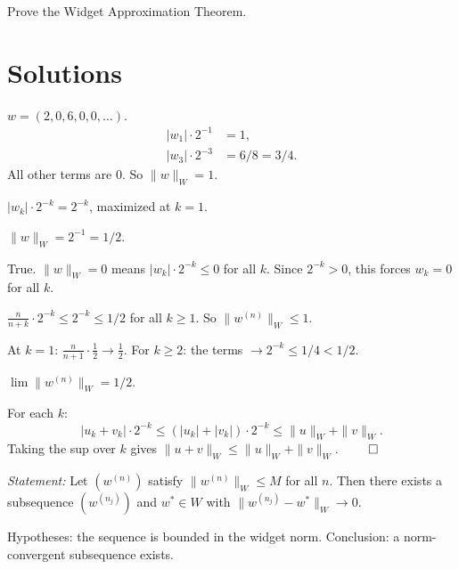 \documentclass[10pt, a4paper]{article}
\begin{document}
\begin{qhard}[Q10]
Prove the Widget Approximation Theorem.
\end{qhard}


\newpage


\section*{Solutions}

\begin{solution}[Q1]
$w = (2, 0, 6, 0, 0, \ldots)$.
\begin{align*}
  |w_1| \cdot 2^{-1} &= 1, \\
  |w_3| \cdot 2^{-3} &= 6/8 = 3/4.
\end{align*}
All other terms are 0. So $\|w\|_W = \boxed{1}$.
\end{solution}

\begin{solution}[Q2]
$|w_k| \cdot 2^{-k} = 2^{-k}$, maximized at $k = 1$.

$\|w\|_W = 2^{-1} = \boxed{1/2}$.
\end{solution}

\begin{solution}[Q3]
True. $\|w\|_W = 0$ means $|w_k| \cdot 2^{-k} \le 0$ for all $k$.
Since $2^{-k} > 0$, this forces $w_k = 0$ for all $k$.
\end{solution}

\begin{solution}[Q4]
$\frac{n}{n+k} \cdot 2^{-k} \le 2^{-k} \le 1/2$ for all $k \ge 1$.
So $\|w^{(n)}\|_W \le 1$.

At $k = 1$: $\frac{n}{n+1} \cdot \frac{1}{2} \to \frac{1}{2}$.
For $k \ge 2$: the terms $\to 2^{-k} \le 1/4 < 1/2$.

$\lim \|w^{(n)}\|_W = \boxed{1/2}$.
\end{solution}

\begin{solution}[Q5]
For each $k$:
\[
  |u_k + v_k| \cdot 2^{-k} \le (|u_k| + |v_k|) \cdot 2^{-k}
  \le \|u\|_W + \|v\|_W.
\]
Taking the sup over $k$ gives $\|u + v\|_W \le \|u\|_W + \|v\|_W$. $\qed$
\end{solution}

\begin{solution}[Q6]
\textit{Statement:} Let $(w^{(n)})$ satisfy $\|w^{(n)}\|_W \le M$ for all $n$.
Then there exists a subsequence $(w^{(n_j)})$ and $w^* \in W$ with
$\|w^{(n_j)} - w^*\|_W \to 0$.

Hypotheses: the sequence is bounded in the widget norm.
Conclusion: a norm-convergent subsequence exists.
\end{solution}
\end{document}
